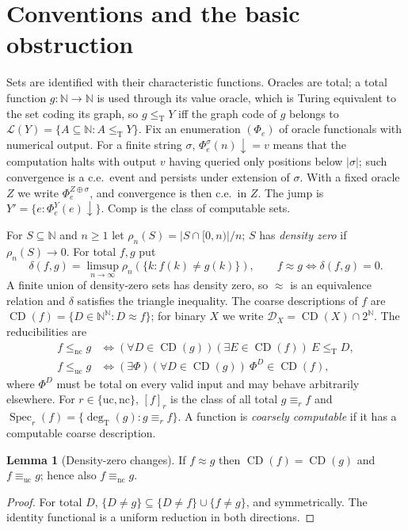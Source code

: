 \documentclass[11pt,letterpaper]{article}
\theoremstyle{definition}
\newtheorem{lemma}[definition]{Lemma}
\numberwithin{equation}{section}
\newcommand{\N}{\mathbb N}
\newcommand{\Cantor}{2^{\N}}
\newcommand{\Baire}{\N^{\N}}
\newcommand{\leT}{\le_{\mathrm T}}
\newcommand{\lenc}{\le_{\mathrm{nc}}}
\newcommand{\leuc}{\le_{\mathrm{uc}}}
\newcommand{\eqnc}{\equiv_{\mathrm{nc}}}
\newcommand{\equc}{\equiv_{\mathrm{uc}}}
\newcommand{\nc}{\mathrm{nc}}
\newcommand{\uc}{\mathrm{uc}}
\newcommand{\CD}{\operatorname{CD}}
\newcommand{\DX}[1]{\mathcal D_{#1}}
\newcommand{\Low}{\mathcal L}
\newcommand{\Comp}{\mathrm{Comp}}
\newcommand{\Spec}{\operatorname{Spec}}
\newcommand{\degT}{\deg_{\mathrm T}}
\newcommand{\dn}{{\downarrow}}
\newcommand{\src}[1]{\leavevmode{\sffamily\footnotesize\color{Steel}[#1]}}
\begin{document}
\section{Conventions and the basic obstruction}\label{sec:prelim}
Sets are identified with their characteristic functions. Oracles are total; a total function $g:\N\to\N$ is used through its value oracle, which is Turing equivalent to the set coding its graph, so $g\leT Y$ iff the graph code of $g$ belongs to $\Low(Y)=\{A\subseteq\N:A\leT Y\}$. Fix an enumeration $(\Phi_e)$ of oracle functionals with numerical output. For a finite string $\sigma$, $\Phi_e^\sigma(n)\dn=v$ means that the computation halts with output $v$ having queried only positions below $|\sigma|$; such convergence is a c.e.\ event and persists under extension of $\sigma$. With a fixed oracle $Z$ we write $\Phi_e^{Z\oplus\sigma}$, and convergence is then c.e.\ in $Z$. The jump is $Y'=\{e:\Phi_e^Y(e)\dn\}$. $\Comp$ is the class of computable sets.

For $S\subseteq\N$ and $n\ge1$ let $\rho_n(S)=|S\cap[0,n)|/n$; $S$ has \emph{density zero} if $\rho_n(S)\to0$. For total $f,g$ put
\[
 \delta(f,g)=\limsup_{n\to\infty}\rho_n(\{k:f(k)\ne g(k)\}),\qquad f\approx g\iff\delta(f,g)=0 .
\]
A finite union of density-zero sets has density zero, so $\approx$ is an equivalence relation and $\delta$ satisfies the triangle inequality. The coarse descriptions of $f$ are $\CD(f)=\{D\in\Baire:D\approx f\}$; for binary $X$ we write $\DX X=\CD(X)\cap\Cantor$. The reducibilities are
\begin{align*}
 f\lenc g&\iff(\forall D\in\CD(g))(\exists E\in\CD(f))\ E\leT D,\\
 f\leuc g&\iff(\exists\Phi)(\forall D\in\CD(g))\ \Phi^D\in\CD(f),
\end{align*}
where $\Phi^D$ must be total on every valid input and may behave arbitrarily elsewhere. For $r\in\{\uc,\nc\}$, $[f]_r$ is the class of all total $g\equiv_rf$ and $\Spec_r(f)=\{\degT(g):g\equiv_rf\}$. A function is \emph{coarsely computable} if it has a computable coarse description.

\begin{lemma}[Density-zero changes]\label{lem:change}\src{all reports}
If $f\approx g$ then $\CD(f)=\CD(g)$ and $f\equc g$; hence also $f\eqnc g$.
\end{lemma}
\begin{proof}
For total $D$, $\{D\ne g\}\subseteq\{D\ne f\}\cup\{f\ne g\}$, and symmetrically. The identity functional is a uniform reduction in both directions.
\end{proof}
\end{document}
